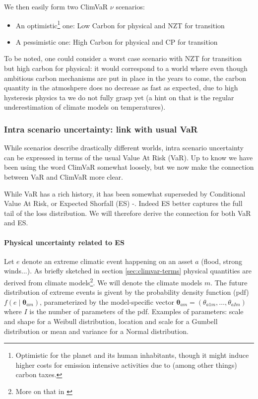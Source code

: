 \vspace{0.2cm}

We then easily form two ClimVaR $\nu$ scenarios:
\begin{itemize}
\item[•] An optimistic\footnote{Optimistic for the planet and its human inhabitants, though it might induce higher costs for emission intensive activities due to (among other things) carbon taxes.} one: Low Carbon for physical and NZT for transition
\item[•] A pessimistic one: High Carbon for physical and CP for transition 
\end{itemize}


To be noted, one could consider a worst case scenario with NZT for transition but high carbon for physical: it would correspond to a world where even though ambitious carbon mechanisms are put in place in the years to come, the carbon quantity in the atmoshpere does no decrease as fast as expected, due to high hysteresis physics ta we do not fully grasp yet (a hint on that is the regular underestimation of climate models on temperatures).

\subsubsection{Intra scenario uncertainty: link with usual VaR} \label{sec:scenario-intra}

While scenarios describe drastically different worlds, intra scenario uncertainty can be expressed in terms of the usual Value At Risk \cite{Jorion} (VaR). Up to know we have been using the word ClimVaR somewhat loosely, but we now make the connection between VaR and ClimVaR more clear.

\vspace{0.2cm}

While VaR has a rich history, it has been somewhat superseded by Conditional Value At Risk, or Expected Shorfall (ES) \cite{Artzner}-\cite{Rockafellar}. Indeed ES better captures the full tail of the loss distribution. We will therefore derive the connection for both VaR and ES.

\paragraph{Physical uncertainty related to ES} \label{sec:shortfall}

Let $e$ denote an extreme climatic event happening on an asset $a$ (flood, strong winds...). As briefly sketched in section \ref{sec:climvar-terms} physical quantities are derived from climate models\footnote{More on that in \cite{Popp}}. We will denote the climate models $m$. The future distribution of extreme events is givent by the  probability density function (pdf) $f(e \mid \bm{\theta}_{am})$, parameterized by the model-specific vector  $\bm{\theta}_{am} = (\theta_{a1m}, \ldots, \theta_{aIm})$ where $I$ is the number of parameters of the pdf. Examples of parameters: scale and shape for a Weibull distribution, location and scale for a Gumbell distribution or mean and variance for a Normal distribution.

